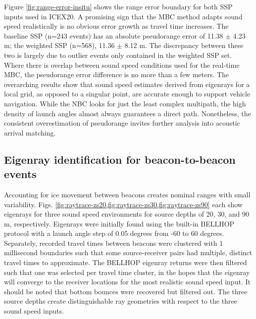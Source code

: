 Figure \ref{fig:range-error-insitu} shows the range error boundary for both SSP inputs used in ICEX20.
A promising sign that the MBC method adapts sound speed realistically is no obvious error growth as travel time increases.
The baseline SSP (n=243 events) has an absolute pseudorange error of 11.38 $\pm$ 4.23 m; the weighted SSP (n=568), 11.36 $\pm$ 8.12 m.
The discrepancy between these two is largely due to outlier events only contained in the weighted SSP set.
Where there is overlap between sound speed conditions used for the real-time MBC, the pseudorange error difference is no more than a few meters.
The overarching results show that sound speed estimates derived from eigenrays for a local grid, as opposed to a singular point, are accurate enough to support vehicle navigation.
While the NBC looks for just the least complex multipath, the high density of launch angles almost always guarantees a direct path.
Nonetheless, the consistent overestimation of pseudorange invites further analysis into acoustic arrival matching.

\subsection{Eigenray identification for beacon-to-beacon events}

Accounting for ice movement between beacons creates nominal ranges with small variability.
Figs. \ref{fig:raytrace-zs20,fig:raytrace-zs30,fig:raytrace-zs90} each show eigenrays for three sound speed environments for source depths of 20, 30, and 90 m, respectively.
Eigenrays were initially found using the built-in BELLHOP protocol with a launch angle step of 0.05 degrees from -60 to 60 degrees.
Separately, recorded travel times between beacons were clustered with 1 millisecond boundaries such that some source-receiver pairs had multiple, distinct travel times to approximate.
The BELLHOP eigenray returns were then filtered such that one was selected per travel time cluster, in the hopes that the eigenray will converge to the receiver locations for the most realistic sound speed input. 
It should be noted that bottom bounces were recovered but filtered out.
The three source depths create distinguishable ray geometries with respect to the three sound speed inputs.

